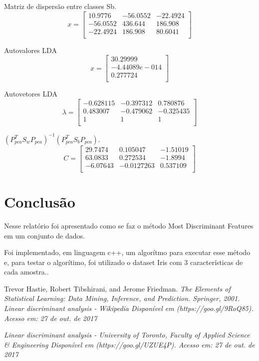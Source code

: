 \documentclass[a4paper, 11pt]{article}
\begin{document}
Matriz de dispersão entre classes Sb.
$$ x =
\begin{bmatrix}
10.9776&-56.0552&-22.4924\\
-56.0552&436.644&186.908\\
-22.4924&186.908&80.6041\\
\end{bmatrix}
$$

Autovalores LDA
$$ x =
\begin{bmatrix}
30.29999\\
-4.44089e-014\\
0.277724\\
\end{bmatrix}
$$

Autovetores LDA
$$ \lambda =
\begin{bmatrix}
-0.628115&-0.397312&0.780876\\
0.483007&-0.479062&-0.325435\\
1&1&1\\
\end{bmatrix}
$$


$(P_{pca}^T S_w P_{pca})^{-1}  (P_{pca}^T S_b P_{pca})$.
$$ C =
\begin{bmatrix}
29.7474&0.105047&-1.51019\\
63.0833&0.272534&-1.8994\\
-6.07643&-0.0127263&0.537109\\
\end{bmatrix}
$$


\section*{Conclusão}
Nesse relatório foi apresentado como se faz o método Most Discriminant Features em um conjunto de dados. 

Foi implementado, em linguagem c++, um algorítmo para executar esse método e, para testar o algorítimo, foi utilizado o dataset Iris com 3 características de cada amostra..



\begin{thebibliography}{9}
Trevor Hastie, Robert Tibshirani, and Jerome Friedman.
\newblock \em{The Elements of Statistical Learning: Data Mining, Inference,
  and Prediction}.
\newblock Springer, 2001.
 \em{Linear discriminant analysis - Wikipedia} \newblock Disponível em (https://goo.gl/9RoQ85). \newblock Acesso em: 27 de out. de 2017

 \em{Linear discriminant analysis - University of Toronto, Faculty of Applied Science \& Engineering} \newblock Disponível em (https://goo.gl/UZUE4P). \newblock Acesso em: 27 de out. de 2017

\end{thebibliography}
\end{document}
